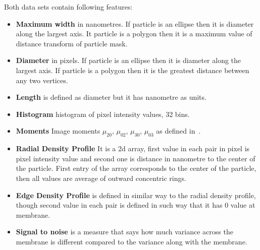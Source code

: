 \documentclass[a4paper, 11pt, table]{article}
\begin{document}
Both data sets contain following features:
\begin{itemize}
\item \textbf{Maximum width} in nanometres. If particle is an ellipse then it is diameter along the largest axis. It particle is a polygon then it is a maximum value of distance transform of particle mask.

\item \textbf{Diameter} in pixels. If particle is an ellipse then it is diameter along the largest axis. If particle is a polygon then it is the greatest distance between any two vertices. 

\item \textbf{Length} is defined as diameter but it has nanometre as units.

\item \textbf{Histogram} histogram of pixel intensity values, 32 bins.

\item \textbf{Moments} Image moments $\mu_{20}$, $\mu_{02}$, $\mu_{30}$, $\mu_{03}$ as defined in~\cite{1057692}. 

\item \textbf{Radial Density Profile} It is a 2d array, first value in each pair in pixel  is pixel intensity value and second one is distance in nanometre to the center of the particle. First entry of the array corresponds to the center of the particle, then all values are average of outward concentric rings.

\item \textbf{Edge Density Profile} is defined in similar way to the radial density profile, though second value in each pair is defined in such way that it has 0 value at membrane.

\item \textbf{Signal to noise} is a measure that says how much variance across the membrane is different compared to the variance along with the membrane.
\end{itemize}
\end{document}
